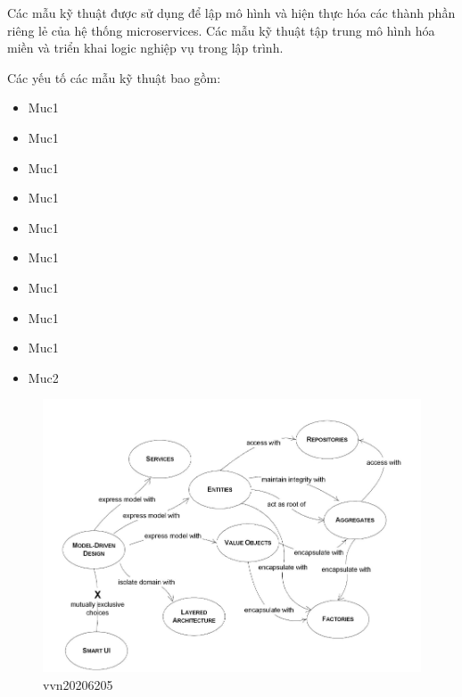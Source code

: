 Các mẫu     kỹ thuật được sử dụng để lập mô hình và hiện thực hóa  các thành phần riêng lẻ của hệ thống microservices.  Các mẫu     kỹ thuật  tập trung    mô hình hóa miền và triển khai logic nghiệp vụ trong lập trình.




 

Các yếu tố  các mẫu     kỹ thuật  bao gồm:





\begin{itemize}
\item Muc1  
\item Muc1  
\item Muc1  
\item Muc1  
\item Muc1  
\item Muc1  
\item Muc1  
\item Muc1  
\item Muc1  
\item Muc2  
\end{itemize}





\begin{figure}[H]

    \centering
    
    \includegraphics[scale = 0.8]{pictures/cac_mau_ky_thuat/temp.png}
    
    \caption{vvn20206205}
    
    \end{figure}
    

